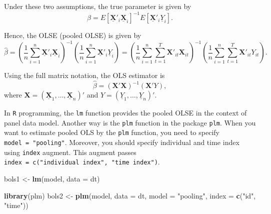 \documentclass[
  12pt,
]{article}
\newenvironment{Shaded}{\begin{snugshade}}{\end{snugshade}}
\newcommand{\DataTypeTok}[1]{\textcolor[rgb]{0.13,0.29,0.53}{#1}}
\newcommand{\KeywordTok}[1]{\textcolor[rgb]{0.13,0.29,0.53}{\textbf{#1}}}
\newcommand{\NormalTok}[1]{#1}
\newcommand{\StringTok}[1]{\textcolor[rgb]{0.31,0.60,0.02}{#1}}
\begin{document}
Under these two assumptions, the true parameter is given by \[
  \beta = E[\underline{\mathbf{X}}'_i\underline{\mathbf{X}}_i]^{-1} E[\underline{\mathbf{X}}'_i\underline{Y}_i].
\]

Hence, the OLSE (pooled OLSE) is given by \[
  \hat{\beta} 
  = \left( \frac{1}{n} \sum_{i=1}^n \underline{\mathbf{X}}'_i\underline{\mathbf{X}}_i \right)^{-1}
  \left( \frac{1}{n} \sum_{i=1}^n \underline{\mathbf{X}}'_i\underline{Y}_i \right)
  = \left( \frac{1}{n} \sum_{i=1}^n \sum_{t=1}^T \mathbf{X}'_{it} \mathbf{X}_{it} \right)^{-1}
  \left( \frac{1}{n} \sum_{i=1}^n \sum_{t=1}^T \mathbf{X}'_{it} Y_{it} \right).
\]

Using the full matrix notation, the OLS estimator is \[
  \hat{\beta} = (\mathbf{X}' \mathbf{X})^{-1} (\mathbf{X}' Y),
\] where
\(\mathbf{X} = (\underline{\mathbf{X}}_1, \ldots, \underline{\mathbf{X}}_n)'\)
and \(Y = (\underline{Y}_1, \ldots, \underline{Y}_n)'\).

In \texttt{R} programming, the \texttt{lm} function provides the pooled
OLSE in the context of panel data model. Another way is the \texttt{plm}
function in the package \texttt{plm}. When you want to estimate pooled
OLS by the \texttt{plm} function, you need to specify
\texttt{model\ =\ "pooling"}. Moreover, you should specify individual
and time index using \texttt{index} augment. This augment passes
\texttt{index\ =\ c("individual\ index",\ "time\ index")}.

\begin{Shaded}
\begin{Highlighting}[]
\NormalTok{bols1 \textless{}{-}}\StringTok{ }\KeywordTok{lm}\NormalTok{(model, }\DataTypeTok{data =}\NormalTok{ dt)}

\KeywordTok{library}\NormalTok{(plm)}
\NormalTok{bols2 \textless{}{-}}\StringTok{ }\KeywordTok{plm}\NormalTok{(model, }\DataTypeTok{data =}\NormalTok{ dt, }\DataTypeTok{model =} \StringTok{"pooling"}\NormalTok{, }\DataTypeTok{index =} \KeywordTok{c}\NormalTok{(}\StringTok{"id"}\NormalTok{, }\StringTok{"time"}\NormalTok{))}
\end{Highlighting}
\end{Shaded}
\end{document}
